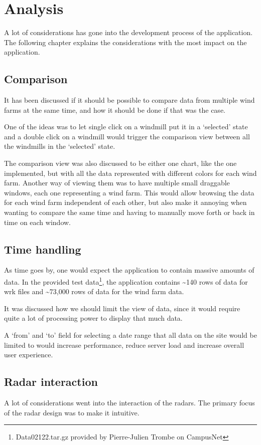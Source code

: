 \chapter{Analysis}
\label{sec:analysis}
A lot of considerations has gone into the development process of the application. The following chapter explains the considerations with the most impact on the application.

\section{Comparison}
\label{sec:comparison}
It has been discussed if it should be possible to compare data from multiple wind farms at the same time, and how it should be done if that was the case.

One of the ideas was to let single click on a windmill put it in a `selected' state and a double click on a windmill would trigger the comparison view between all the windmills in the `selected' state.

The comparison view was also discussed to be either one chart, like the one implemented, but with all the data represented with different colors for each wind farm.
Another way of viewing them was to have multiple small draggable windows, each one representing a wind farm. This would allow browsing the data for each wind farm independent of each other, but also make it annoying when wanting to compare the same time and having to manually move forth or back in time on each window.

\section{Time handling}
\label{sec:time_handling}
As time goes by, one would expect the application to contain massive amounts of data.
In the provided test data\footnote{Data02122.tar.gz provided by Pierre-Julien Trombe on CampusNet}, the application contains \textasciitilde 140 rows of data for \textsf{wrk} files and \textasciitilde 73,000 rows of data for the wind farm data.

It was discussed how we should limit the view of data, since it would require quite a lot of processing power to display that much data.

A `from' and `to' field for selecting a date range that all data on the site would be limited to would increase performance, reduce server load and increase overall user experience.

\section{Radar interaction}
\label{sec:radar_interaction}
A lot of considerations went into the interaction of the radars. The primary focus of the radar design was to make it intuitive.

